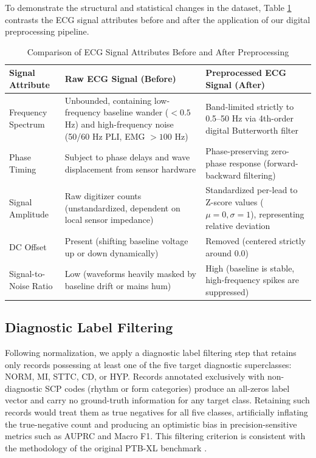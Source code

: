 \documentclass[12pt,a4paper]{report}
\begin{document}
To demonstrate the structural and statistical changes in the dataset, Table \ref{tab:preprocessing_comparison} contrasts the ECG signal attributes before and after the application of our digital preprocessing pipeline.

\begin{table}[H]
\caption{Comparison of ECG Signal Attributes Before and After Preprocessing}
\label{tab:preprocessing_comparison}
\centering
\begin{tabular}{lp{6cm}p{6cm}}
\toprule
\textbf{Signal Attribute} & \textbf{Raw ECG Signal (Before)} & \textbf{Preprocessed ECG Signal (After)} \\
\midrule
Frequency Spectrum & Unbounded, containing low-frequency baseline wander ($<0.5$ Hz) and high-frequency noise (50/60 Hz PLI, EMG $>100$ Hz) & Band-limited strictly to 0.5–50 Hz via 4th-order digital Butterworth filter \\
Phase Timing & Subject to phase delays and wave displacement from sensor hardware & Phase-preserving zero-phase response (forward-backward filtering) \\
Signal Amplitude & Raw digitizer counts (unstandardized, dependent on local sensor impedance) & Standardized per-lead to Z-score values ($\mu = 0, \sigma = 1$), representing relative deviation \\
DC Offset & Present (shifting baseline voltage up or down dynamically) & Removed (centered strictly around 0.0) \\
Signal-to-Noise Ratio & Low (waveforms heavily masked by baseline drift or mains hum) & High (baseline is stable, high-frequency spikes are suppressed) \\
\bottomrule
\end{tabular}
\end{table}

\subsection*{Diagnostic Label Filtering}
Following normalization, we apply a diagnostic label filtering step that retains only records possessing at least one of the five target diagnostic superclasses: NORM, MI, STTC, CD, or HYP. Records annotated exclusively with non-diagnostic SCP codes (rhythm or form categories) produce an all-zeros label vector and carry no ground-truth information for any target class. Retaining such records would treat them as true negatives for all five classes, artificially inflating the true-negative count and producing an optimistic bias in precision-sensitive metrics such as AUPRC and Macro F1. This filtering criterion is consistent with the methodology of the original PTB-XL benchmark \cite{strodthoff2021deep}.
\end{document}
